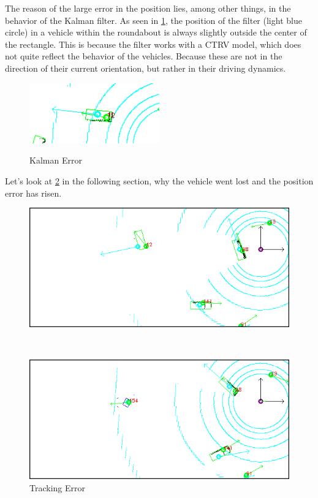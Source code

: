 \documentclass[11pt,oneside,openright]{mpreport}
\begin{document}
The reason of the large error in the position lies, among other things, in the behavior of the Kalman filter.
As seen in \cref{kalman_error}, the position of the filter (light blue circle) in a vehicle within the roundabout is always slightly outside the center of the rectangle. 
This is because the filter works with a \ac{CTRV} model, which does not quite reflect the behavior of the vehicles.
Because these are not in the direction of their current orientation, but rather in their driving dynamics.

\begin{figure}[!htb]
  \caption{Kalman Error} 
  \centering
  \includegraphics[width=0.5\textwidth]{bilder/kalman.png}
 \label{kalman_error}
\end{figure}

Let's look at \cref{lost} in the following section, why the vehicle went lost and the position error has risen.

\begin{figure}[htb]
  \caption{Tracking Error} 
    \centering
    \begin{minipage}[t]{\textwidth}
        \centering
        \includegraphics[width=\textwidth]{bilder/alg/lost.png}
    \end{minipage}%
    \\
    \begin{minipage}[t]{\textwidth}
        \centering
	\includegraphics[width=\textwidth]{bilder/alg/redetect.png}
    \end{minipage}
    \label{lost}
\end{figure}
\end{document}
